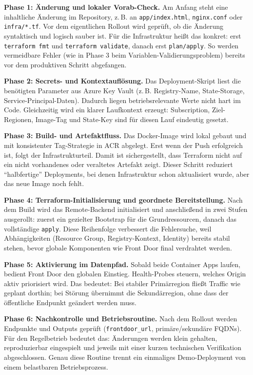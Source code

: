 \documentclass[a4paper,11pt]{article}
\begin{document}
\textbf{Phase 1: Änderung und lokaler Vorab-Check.}
Am Anfang steht eine inhaltliche Änderung im Repository, z.\,B. an \texttt{app/index.html}, \texttt{nginx.conf} oder \texttt{infra/*.tf}. Vor dem eigentlichen Rollout wird geprüft, ob die Änderung syntaktisch und logisch sauber ist. Für die Infrastruktur heißt das konkret: erst \texttt{terraform fmt} und \texttt{terraform validate}, danach erst \texttt{plan/apply}. So werden vermeidbare Fehler (wie in Phase 3 beim Variablen-Validierungsproblem) bereits vor dem produktiven Schritt abgefangen.

\textbf{Phase 2: Secrets- und Kontextauflösung.}
Das Deployment-Skript liest die benötigten Parameter aus Azure Key Vault (z.\,B. Registry-Name, State-Storage, Service-Principal-Daten). Dadurch liegen betriebsrelevante Werte nicht hart im Code. Gleichzeitig wird ein klarer Laufkontext erzeugt: Subscription, Ziel-Regionen, Image-Tag und State-Key sind für diesen Lauf eindeutig gesetzt.

\textbf{Phase 3: Build- und Artefaktfluss.}
Das Docker-Image wird lokal gebaut und mit konsistenter Tag-Strategie in ACR abgelegt. Erst wenn der Push erfolgreich ist, folgt der Infrastrukturteil. Damit ist sichergestellt, dass Terraform nicht auf ein nicht vorhandenes oder veraltetes Artefakt zeigt. Dieser Schritt reduziert ``halbfertige'' Deployments, bei denen Infrastruktur schon aktualisiert wurde, aber das neue Image noch fehlt.

\textbf{Phase 4: Terraform-Initialisierung und geordnete Bereitstellung.}
Nach dem Build wird das Remote-Backend initialisiert und anschließend in zwei Stufen ausgerollt: zuerst ein gezielter Bootstrap für die Grundressourcen, danach das vollständige \texttt{apply}. Diese Reihenfolge verbessert die Fehlersuche, weil Abhängigkeiten (Resource Group, Registry-Kontext, Identity) bereits stabil stehen, bevor globale Komponenten wie Front Door final verdrahtet werden.

\textbf{Phase 5: Aktivierung im Datenpfad.}
Sobald beide Container Apps laufen, bedient Front Door den globalen Einstieg. Health-Probes steuern, welches Origin aktiv priorisiert wird. Das bedeutet: Bei stabiler Primärregion fließt Traffic wie geplant dorthin; bei Störung übernimmt die Sekundärregion, ohne dass der öffentliche Endpunkt geändert werden muss.

\textbf{Phase 6: Nachkontrolle und Betriebsroutine.}
Nach dem Rollout werden Endpunkte und Outputs geprüft (\texttt{frontdoor\_url}, primäre/sekundäre FQDNs). Für den Regelbetrieb bedeutet das: Änderungen werden klein gehalten, reproduzierbar eingespielt und jeweils mit einer kurzen technischen Verifikation abgeschlossen. Genau diese Routine trennt ein einmaliges Demo-Deployment von einem belastbaren Betriebsprozess.
\end{document}
